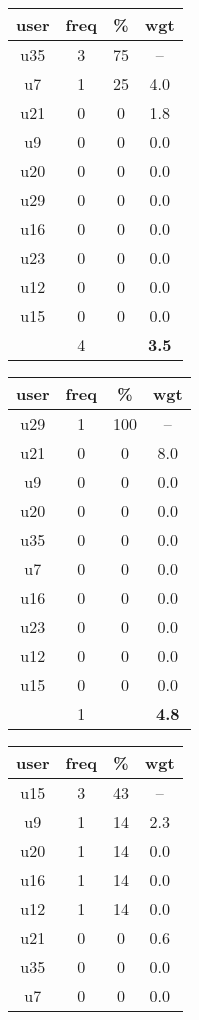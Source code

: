 \begin{appendices}
\begin{table}
\begin{tabular}{ |c|c|c|c| }
	\hline
	\textbf{user} & \textbf{freq} & \textbf{\%} & \textbf{wgt} \\
	\hline
	u35 & 3 & 75 & -- \\
	u7 & 1 & 25 & 4.0 \\
	u21 & 0 & 0 & 1.8 \\
	u9 & 0 & 0 & 0.0 \\
	u20 & 0 & 0 & 0.0 \\
	u29 & 0 & 0 & 0.0 \\
	u16 & 0 & 0 & 0.0 \\
	u23 & 0 & 0 & 0.0 \\
	u12 & 0 & 0 & 0.0 \\
	u15 & 0 & 0 & 0.0 \\
	 & 4 & & \textbf{3.5} \\
	\hline
\end{tabular}
\begin{tabular}{ |c|c|c|c| }
	\hline
	\textbf{user} & \textbf{freq} & \textbf{\%} & \textbf{wgt} \\
	\hline
	u29 & 1 & 100 & -- \\
	u21 & 0 & 0 & 8.0 \\
	u9 & 0 & 0 & 0.0 \\
	u20 & 0 & 0 & 0.0 \\
	u35 & 0 & 0 & 0.0 \\
	u7 & 0 & 0 & 0.0 \\
	u16 & 0 & 0 & 0.0 \\
	u23 & 0 & 0 & 0.0 \\
	u12 & 0 & 0 & 0.0 \\
	u15 & 0 & 0 & 0.0 \\
	 & 1 & & \textbf{4.8} \\
	\hline
\end{tabular}
\begin{tabular}{ |c|c|c|c| }
	\hline
	\textbf{user} & \textbf{freq} & \textbf{\%} & \textbf{wgt} \\
	\hline
	u15 & 3 & 43 & -- \\
	u9 & 1 & 14 & 2.3 \\
	u20 & 1 & 14 & 0.0 \\
	u16 & 1 & 14 & 0.0 \\
	u12 & 1 & 14 & 0.0 \\
	u21 & 0 & 0 & 0.6 \\
	u35 & 0 & 0 & 0.0 \\
	u7 & 0 & 0 & 0.0 \\

\end{tabular}
\end{table}
\end{appendices}
